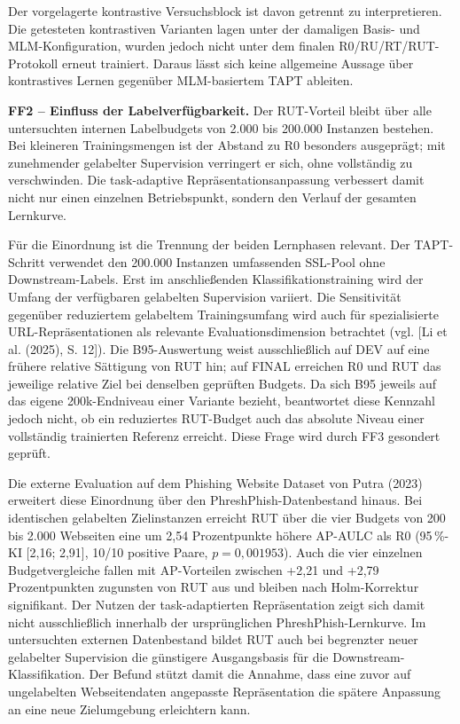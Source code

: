Der vorgelagerte kontrastive Versuchsblock ist davon getrennt zu interpretieren. Die
getesteten kontrastiven Varianten lagen unter der damaligen Basis- und MLM-Konfiguration,
wurden jedoch nicht unter dem finalen R0/RU/RT/RUT-Protokoll erneut trainiert. Daraus
lässt sich keine allgemeine Aussage über kontrastives Lernen gegenüber MLM-basiertem
TAPT ableiten.


\textbf{FF2 -- Einfluss der Labelverfügbarkeit.}
Der RUT-Vorteil bleibt über alle untersuchten internen Labelbudgets von 2.000 bis
200.000 Instanzen bestehen. Bei kleineren Trainingsmengen ist der Abstand zu R0 besonders
ausgeprägt; mit zunehmender gelabelter Supervision verringert er sich, ohne vollständig zu
verschwinden. Die task-adaptive Repräsentationsanpassung verbessert damit nicht nur einen
einzelnen Betriebspunkt, sondern den Verlauf der gesamten Lernkurve.

Für die Einordnung ist die Trennung der beiden Lernphasen relevant. Der TAPT-Schritt
verwendet den 200.000 Instanzen umfassenden SSL-Pool ohne Downstream-Labels. Erst im
anschließenden Klassifikationstraining wird der Umfang der verfügbaren gelabelten Supervision
variiert. Die Sensitivität gegenüber reduziertem gelabeltem Trainingsumfang wird auch für
spezialisierte URL-Repräsentationen als relevante Evaluationsdimension betrachtet
(vgl. [Li et al. (2025), S. 12]). Die B95-Auswertung weist ausschließlich auf DEV auf eine frühere relative Sättigung von RUT hin; auf FINAL erreichen R0 und RUT das jeweilige relative Ziel bei denselben geprüften Budgets.
Da sich B95 jeweils auf das eigene 200k-Endniveau einer Variante bezieht, beantwortet diese
Kennzahl jedoch nicht, ob ein reduziertes RUT-Budget auch das absolute Niveau einer
vollständig trainierten Referenz erreicht. Diese Frage wird durch FF3 gesondert geprüft.

Die externe Evaluation auf dem Phishing Website Dataset von Putra (2023) erweitert diese
Einordnung über den PhreshPhish-Datenbestand hinaus. Bei identischen gelabelten
Zielinstanzen erreicht RUT über die vier Budgets von 200 bis 2.000 Webseiten eine um
2,54 Prozentpunkte höhere AP-AULC als R0 (95\,\%-KI [2,16; 2,91], 10/10 positive
Paare, $p=0{,}001953$). Auch die vier einzelnen Budgetvergleiche fallen mit
AP-Vorteilen zwischen +2,21 und +2,79 Prozentpunkten zugunsten von RUT aus und bleiben
nach Holm-Korrektur signifikant. Der Nutzen der task-adaptierten Repräsentation zeigt sich damit nicht ausschließlich innerhalb
der ursprünglichen PhreshPhish-Lernkurve. Im untersuchten externen Datenbestand bildet RUT
auch bei begrenzter neuer gelabelter Supervision die günstigere Ausgangsbasis für die
Downstream-Klassifikation. Der Befund stützt damit die Annahme, dass eine zuvor auf
ungelabelten Webseitendaten angepasste Repräsentation die spätere Anpassung an eine neue
Zielumgebung erleichtern kann.



